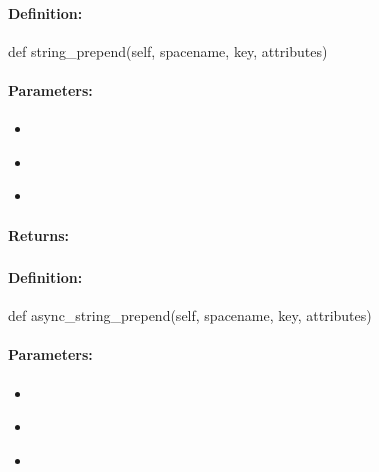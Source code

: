 \paragraph{Definition:}
\begin{pythoncode}
def string_prepend(self, spacename, key, attributes)
\end{pythoncode}

\paragraph{Parameters:}
\begin{itemize}[noitemsep]
\item {}\\

\item {}\\

\item {}\\

\end{itemize}

\paragraph{Returns:}


\pagebreak
\subsubsection{}
\label{api:python:async_string_prepend}


\paragraph{Definition:}
\begin{pythoncode}
def async_string_prepend(self, spacename, key, attributes)
\end{pythoncode}

\paragraph{Parameters:}
\begin{itemize}[noitemsep]
\item {}\\

\item {}\\

\item {}\\

\end{itemize}

